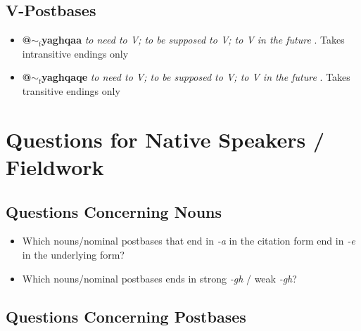 \documentclass{article}
\begin{document}
\subsection{\textbf{V}-Postbases}

\begin{itemize}
\renewcommand\labelitemi{$\cdot$}
\item \textbf{@$\sim_\text{f}$yaghqaa} \textit{to need to V; to be supposed to V; to V in the future} . Takes intransitive endings only 
\item \textbf{@$\sim_\text{f}$yaghqaqe} \textit{to need to V; to be supposed to V; to V in the future} . Takes transitive endings only
\end{itemize}




\section{Questions for Native Speakers / Fieldwork}


\subsection{Questions Concerning Nouns}

\begin{itemize}
\renewcommand\labelitemi{$\cdot$}

\item Which nouns/nominal postbases that end in \textit{-a} in the citation form end in \textit{-e} in the underlying form? 

\item Which nouns/nominal postbases ends in strong \textit{-gh} / weak \textit{-gh}? 

\end{itemize}

\subsection{Questions Concerning Postbases}
\end{document}

